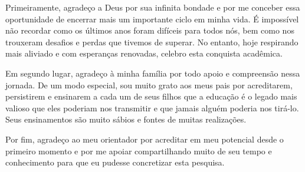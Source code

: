 \begin{agradecimentos}
    Primeiramente, agradeço a Deus por sua infinita bondade e por me conceber essa oportunidade de encerrar mais um importante ciclo em minha vida.
    É impossível não recordar como os últimos anos foram difíceis para todos nós, bem como nos trouxeram desafios e perdas que tivemos de superar. 
    No entanto, hoje respirando mais aliviado e com esperanças renovadas, celebro esta conquista acadêmica.
    
    Em segundo lugar, agradeço à minha família por todo apoio e compreensão nessa jornada. De um modo especial, sou muito grato aos meus pais por acreditarem, persistirem e ensinarem a cada um de seus filhos que a educação é o legado mais valioso que eles poderiam nos transmitir e que jamais alguém poderia nos tirá-lo.
    Seus ensinamentos são muito sábios e fontes de muitas realizações.

    Por fim, agradeço ao meu orientador por acreditar em meu potencial desde o primeiro momento e por me apoiar compartilhando muito de seu tempo e conhecimento para que eu pudesse concretizar esta pesquisa.
\end{agradecimentos}